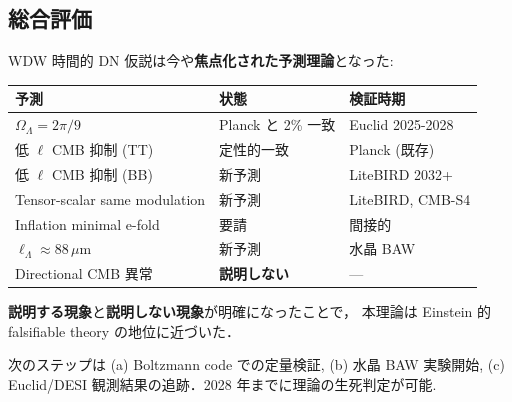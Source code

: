 \documentclass[11pt,a4paper]{article}
\begin{document}
\subsection*{総合評価}

WDW 時間的 DN 仮説は今や\textbf{焦点化された予測理論}となった:

\begin{center}
\begin{tabular}{lll}
\toprule
予測 & 状態 & 検証時期 \\
\midrule
$\Omega_\Lambda = 2\pi/9$ & Planck と 2\% 一致 & Euclid 2025-2028 \\
低 $\ell$ CMB 抑制 (TT) & 定性的一致 & Planck (既存) \\
低 $\ell$ CMB 抑制 (BB) & 新予測 & LiteBIRD 2032+ \\
Tensor-scalar same modulation & 新予測 & LiteBIRD, CMB-S4 \\
Inflation minimal e-fold & 要請 & 間接的 \\
$\ell_\Lambda \approx 88\,\mu$m & 新予測 & 水晶 BAW \\
Directional CMB 異常 & \textbf{説明しない} & — \\
\bottomrule
\end{tabular}
\end{center}

\textbf{説明する現象}と\textbf{説明しない現象}が明確になったことで，
本理論は Einstein 的 falsifiable theory の地位に近づいた．

次のステップは (a) Boltzmann code での定量検証, (b) 水晶 BAW 実験開始,
(c) Euclid/DESI 観測結果の追跡．2028 年までに理論の生死判定が可能.
\end{document}
